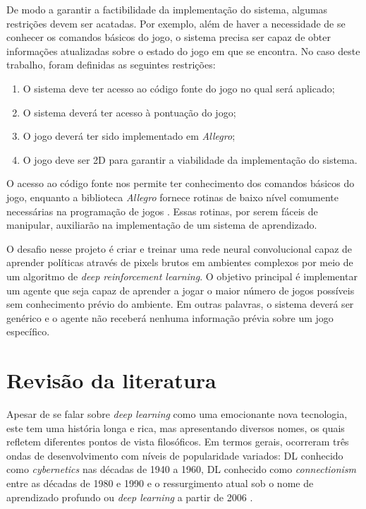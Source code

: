 De modo a garantir a factibilidade da implementação do sistema, algumas restrições devem ser acatadas. Por exemplo, além de haver a necessidade de se conhecer os comandos básicos do jogo, o sistema precisa ser capaz de obter informações atualizadas sobre o estado do jogo em que se encontra. No caso deste trabalho, foram definidas as seguintes restrições:

\begin{enumerate}
	\item O sistema deve ter acesso ao código fonte do jogo no qual será aplicado;
	\item O sistema deverá ter acesso à pontuação do jogo;
	\item O jogo deverá ter sido implementado em \textit{Allegro};
	\item O jogo deve ser 2D para garantir a viabilidade da implementação do sistema.
\end{enumerate}

O acesso ao código fonte nos permite ter conhecimento dos comandos básicos do jogo, enquanto a biblioteca \textit{Allegro} fornece rotinas de baixo nível comumente necessárias na programação de jogos \cite{allegro}. Essas rotinas, por serem fáceis de manipular, auxiliarão na implementação de um sistema de aprendizado.

O desafio nesse projeto é criar e treinar uma rede neural convolucional capaz de aprender políticas através de pixels brutos em ambientes complexos por meio de um algoritmo de \textit{deep reinforcement learning}. O objetivo principal é implementar um agente que seja capaz de aprender a jogar o maior número de jogos possíveis sem conhecimento prévio do ambiente. Em outras palavras, o sistema deverá ser genérico e o agente não receberá nenhuma informação prévia sobre um jogo específico.

\section{Revisão da literatura}

Apesar de se falar sobre \textit{deep learning} como uma emocionante nova tecnologia, este tem uma história longa e rica, mas apresentando diversos nomes, os quais refletem diferentes pontos de vista filosóficos. Em termos gerais, ocorreram três ondas de desenvolvimento com níveis de popularidade variados: DL conhecido como \textit{cybernetics} nas décadas de 1940 a 1960, DL conhecido como \textit{connectionism} entre as décadas de 1980 e 1990 e o ressurgimento atual sob o nome de aprendizado profundo ou \textit{deep learning} a partir de 2006 \cite{Goodfellow-et-al-2016}.

